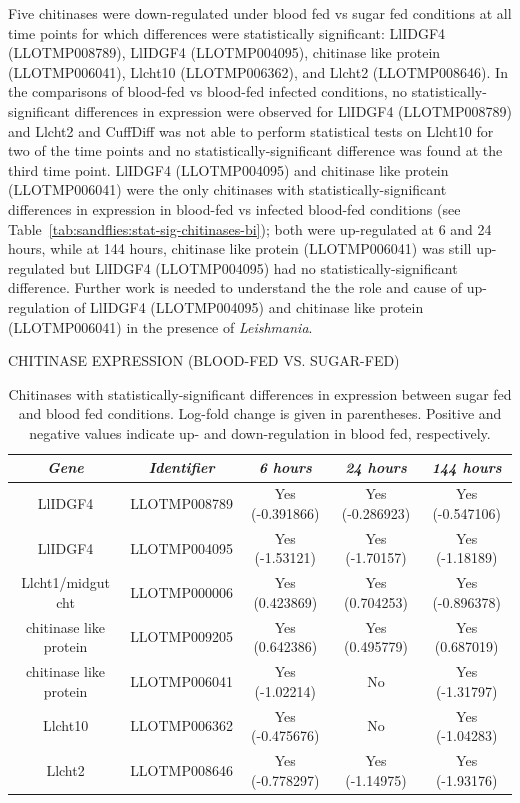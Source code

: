 Five chitinases were down-regulated under blood fed vs sugar fed conditions at all time points for which differences were statistically significant: LlIDGF4 (LLOTMP008789), LlIDGF4 (LLOTMP004095), chitinase like protein (LLOTMP006041), Llcht10 (LLOTMP006362), and Llcht2 (LLOTMP008646).  In the comparisons of blood-fed vs blood-fed infected conditions, no statistically-significant differences in expression were observed for LlIDGF4 (LLOTMP008789) and Llcht2 and CuffDiff was not able to perform statistical tests on Llcht10 for two of the time points and no statistically-significant difference was found at the third time point. LlIDGF4 (LLOTMP004095) and chitinase like protein (LLOTMP006041) were the only chitinases with statistically-significant differences in expression in blood-fed vs infected blood-fed conditions (see Table~\ref{tab:sandflies:stat-sig-chitinases-bi}); both were up-regulated at 6 and 24 hours, while at 144 hours, chitinase like protein (LLOTMP006041) was still up-regulated but LlIDGF4 (LLOTMP004095) had no statistically-significant difference. Further work is needed to understand the the role and cause of up-regulation of LlIDGF4 (LLOTMP004095) and chitinase like protein (LLOTMP006041) in the presence of \emph{Leishmania}.

\begin{table}[H]
  \centering
  \caption{CHITINASE EXPRESSION (BLOOD-FED VS. SUGAR-FED)}
  \begin{tabular}{ c c c c c } \hline
    \emph{Gene} & \emph{Identifier} & \emph{6 hours} & \emph{24 hours} & \emph{144 hours} \\ \hline
    LlIDGF4 & LLOTMP008789 & Yes (-0.391866) & Yes (-0.286923) & Yes (-0.547106) \\
    LlIDGF4 & LLOTMP004095 & Yes (-1.53121) & Yes (-1.70157) & Yes (-1.18189) \\
    Llcht1/midgut cht & LLOTMP000006 & Yes (0.423869) & Yes (0.704253) & Yes (-0.896378) \\
    chitinase like protein & LLOTMP009205 & Yes (0.642386) & Yes (0.495779) & Yes (0.687019) \\
    chitinase like protein & LLOTMP006041 & Yes (-1.02214) & No & Yes (-1.31797) \\
    Llcht10 & LLOTMP006362 & Yes (-0.475676) & No & Yes (-1.04283) \\
    Llcht2 & LLOTMP008646 & Yes (-0.778297) & Yes (-1.14975) & Yes (-1.93176)
  \end{tabular}
  \caption*{Chitinases with statistically-significant differences in expression between sugar fed and blood fed conditions. Log-fold change is given in parentheses. Positive and negative values indicate up- and down-regulation in blood fed, respectively.}
  \label{tab:sandflies:stat-sig-chitinases-sb}
\end{table}

